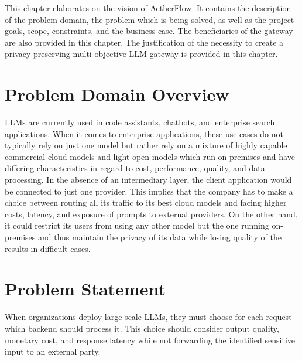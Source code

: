 \documentclass{FastFyp}
\begin{document}
This chapter elaborates on the vision of AetherFlow. It contains the description of the problem domain, the problem which is being solved, as well as the project goals, scope, constraints, and the business case. The beneficiaries of the gateway are also provided in this chapter. The justification of the necessity to create a privacy-preserving multi-objective LLM gateway is provided in this chapter.
\section{Problem Domain Overview}
\label{sec:domain}

LLMs are currently used in code assistants, chatbots, and enterprise search applications. When it comes to enterprise applications, these use cases do not typically rely on just one model but rather rely on a mixture of highly capable commercial cloud models and light open models which run on-premises and have differing characteristics in regard to cost, performance, quality, and data processing.
In the absence of an intermediary layer, the client application would be connected to just one provider. This implies that the company has to make a choice between routing all its traffic to its best cloud models and facing higher costs, latency, and exposure of prompts to external providers. On the other hand, it could restrict its users from using any other model but the one running on-premises and thus maintain the privacy of its data while losing quality of the results in difficult cases.

\section{Problem Statement}
\label{sec:problem-statement}

When organizations deploy large-scale LLMs, they must choose for each request which backend should process it. This choice should consider output quality, monetary cost, and response latency while not forwarding the identified sensitive input to an external party.
\end{document}

